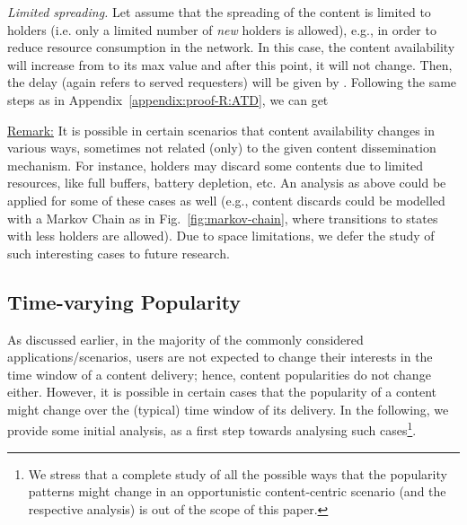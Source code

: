\documentclass[journal]{IEEEtran}
\newcommand{\revisionRed}[1]{{#1}}\newcommand{\red}[1]{{#1}}
\begin{document}
\red{\textit{Limited spreading.} Let assume that the spreading of the content is limited to  holders (i.e. only a limited number of  \textit{new} holders is allowed), e.g., in order to reduce resource consumption in the network. In this case, the content availability will increase from  to its max value  and after this point, it will not change. Then, the delay  (again  refers to served requesters) will be given by . Following the same steps as in  Appendix~\ref{appendix:proof-R:ATD}, we can get

}

\revisionRed{\underline{Remark:} It is possible in certain scenarios that content availability changes in various ways, sometimes not related (only) to the given content dissemination mechanism. For instance, holders may discard some contents due to limited resources, like full buffers, battery depletion, etc. An analysis as above could be applied for some of these cases as well (e.g., content discards could be modelled with a Markov Chain as in Fig.~\ref{fig:markov-chain}, where transitions to states with less holders are allowed). Due to space limitations, we defer the study of such interesting cases to future research.}

\subsection*{\revisionRed{\textbf{Time-varying Popularity}}}
\revisionRed{As discussed earlier, in the majority of the commonly considered applications/scenarios, users are not expected to change their interests in the time window of a content delivery; hence, content popularities do not change either. However, it is possible in certain cases that the popularity of a content might change over the (typical) time window of its delivery. In the following, we provide some initial analysis, as a first step towards analysing such cases\footnote{\revisionRed{We stress that a complete study of all the possible ways that the popularity patterns might change in an opportunistic content-centric scenario (and the respective analysis) is out of the scope of this paper.}}.}
\end{document}

